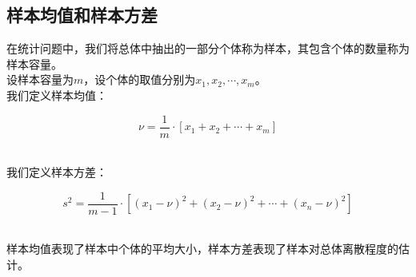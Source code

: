 \documentclass[UTF8]{ctexart}
\begin{document}
\newpage

\subsection{样本均值和样本方差}
    在统计问题中，我们将总体中抽出的一部分个体称为样本，其包含个体的数量称为样本容量。\\[3mm]
    设样本容量为$m$，设个体的取值分别为$x_1,x_2,\cdots,x_m$。\\[3mm]
    我们定义样本均值：
    \begin{large}
        \begin{equation*}
            \nu=\frac{1}{m}\cdot\left[x_1+x_2+\cdots+x_m\right]
        \end{equation*}
    \end{large}\\
    我们定义样本方差：
    \begin{large}
        \begin{equation*}
            s^2=\frac{1}{m-1}\cdot\left[(x_1-\nu)^2+(x_2-\nu)^2+\cdots+(x_n-\nu)^2\right]
        \end{equation*}
    \end{large}\\
    样本均值表现了样本中个体的平均大小，样本方差表现了样本对总体离散程度的估计。
\end{document}
